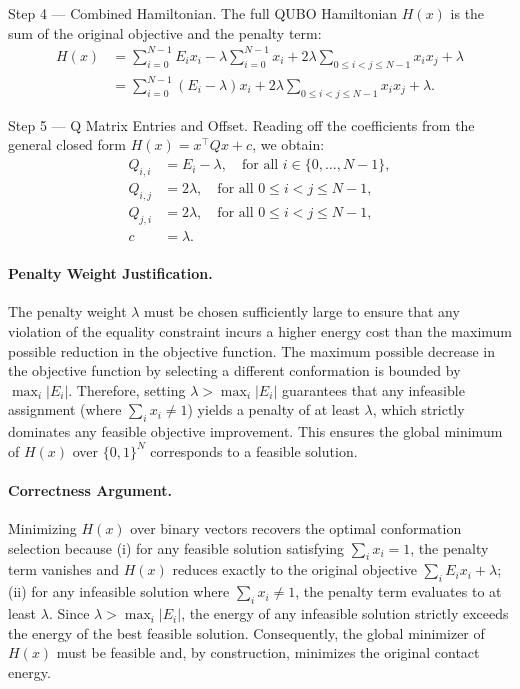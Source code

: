 \documentclass[12pt]{article}
\begin{document}
Step 4 --- Combined Hamiltonian. The full QUBO Hamiltonian $H(x)$ is the sum of the original objective and the penalty term:
\begin{align}
H(x) &= \sum_{i=0}^{N-1} E_i x_i - \lambda \sum_{i=0}^{N-1} x_i + 2\lambda \sum_{0 \leq i < j \leq N-1} x_i x_j + \lambda \\
&= \sum_{i=0}^{N-1} (E_i - \lambda) x_i + 2\lambda \sum_{0 \leq i < j \leq N-1} x_i x_j + \lambda.
\end{align}

Step 5 --- Q Matrix Entries and Offset. Reading off the coefficients from the general closed form $H(x) = x^\top Q x + c$, we obtain:
\begin{align}
Q_{i,i} &= E_i - \lambda, \quad \text{for all } i \in \{0, \dots, N-1\}, \\
Q_{i,j} &= 2\lambda, \quad \text{for all } 0 \leq i < j \leq N-1, \\
Q_{j,i} &= 2\lambda, \quad \text{for all } 0 \leq i < j \leq N-1, \\
c &= \lambda.
\end{align}

\paragraph{Penalty Weight Justification.}
The penalty weight $\lambda$ must be chosen sufficiently large to ensure that any violation of the equality constraint incurs a higher energy cost than the maximum possible reduction in the objective function. The maximum possible decrease in the objective function by selecting a different conformation is bounded by $\max_{i} |E_i|$. Therefore, setting $\lambda > \max_{i} |E_i|$ guarantees that any infeasible assignment (where $\sum_i x_i \neq 1$) yields a penalty of at least $\lambda$, which strictly dominates any feasible objective improvement. This ensures the global minimum of $H(x)$ over $\{0,1\}^N$ corresponds to a feasible solution.

\paragraph{Correctness Argument.}
Minimizing $H(x)$ over binary vectors recovers the optimal conformation selection because (i) for any feasible solution satisfying $\sum_i x_i = 1$, the penalty term vanishes and $H(x)$ reduces exactly to the original objective $\sum_i E_i x_i + \lambda$; (ii) for any infeasible solution where $\sum_i x_i \neq 1$, the penalty term evaluates to at least $\lambda$. Since $\lambda > \max_i |E_i|$, the energy of any infeasible solution strictly exceeds the energy of the best feasible solution. Consequently, the global minimizer of $H(x)$ must be feasible and, by construction, minimizes the original contact energy.
\end{document}
